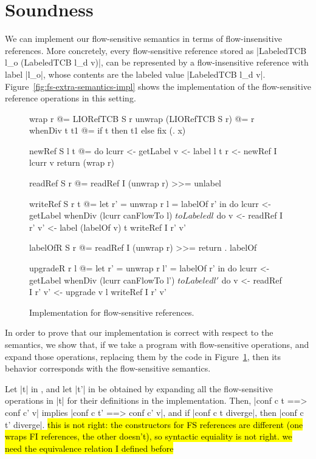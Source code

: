 \section{Soundness}
\label{sec:soundness}

We can implement our flow-sensitive semantics in terms of
flow-insensitive references. More concretely, every flow-sensitive
reference stored as |LabeledTCB l_o (LabeledTCB l_d v)|, can be
represented by a flow-insensitive reference with label |l_o|, whose
contents are the labeled value |LabeledTCB l_d
v|. Figure~\ref{fig:fs-extra-semantics-impl} shows the implementation
of the flow-sensitive reference operations in this setting.

\begin{figure}
\small
\begin{code}
wrap r @= LIORefTCB S r
unwrap (LIORefTCB S r) @= r
whenDiv t t1 @= if t then t1 else fix (\x. x)

newRef S l t @= do
  lcurr  <- getLabel
  v      <- label l t
  r      <- newRef I lcurr v
  return (wrap r)


readRef S r @= readRef I (unwrap r) >>= unlabel


writeRef S r t @= let  r'  = unwrap r
                       l   = labelOf r' in do
  lcurr <- getLabel
  whenDiv (lcurr canFlowTo l) $ toLabeled l $ do
     v   <- readRef I r'
     v'  <- label (labelOf v) t
     writeRef I r' v'


labelOfR S r @= readRef I (unwrap r) >>= return . labelOf

upgradeR r l @= let  r'  = unwrap r
                     l'  = labelOf r' in do
  lcurr <- getLabel
  whenDiv (lcurr canFlowTo l') $ toLabeled l' $ do
     v   <- readRef I r'
     v'  <- upgrade v l
     writeRef I r' v'

\end{code}
\caption{Implementation for flow-sensitive references.\label{fig:fs-exts-semantics-impl}}
\end{figure}

In order to prove that our implementation is correct with respect to
the semantics, we show that, if we take a program with flow-sensitive
operations, and expand those operations, replacing them by the code in
Figure~\ref{fig:fs-exts-semantics-impl}, then its behavior corresponds
with the flow-sensitive semantics.

\begin{theorem}\label{thm:eq} Let |t| in \liofs{}, and let |t'| in \lio{} be
  obtained by expanding all the flow-sensitive operations in |t| for
  their definitions in the implementation. Then, |conf c t ==> conf
  c' v| implies |conf c t' ==> conf c' v|, and if |conf c t diverge|,
  then |conf c t' diverge|.
  \textrm{\hl{this is not right: the constructors for FS references are
  different (one wraps FI references, the other doesn't), so syntactic
  equiality is not right.  we need the equivalence relation I defined before}}
\end{theorem}

